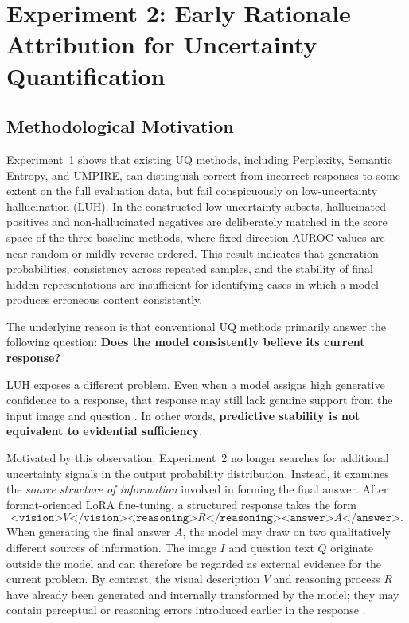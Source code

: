 \section{Experiment 2: Early Rationale Attribution for Uncertainty Quantification}
\label{sec:era_method}

\subsection{Methodological Motivation}
\label{subsec:era_motivation}

Experiment~1 shows that existing UQ methods, including Perplexity, Semantic Entropy, and UMPIRE, can distinguish correct from incorrect responses to some extent on the full evaluation data, but fail conspicuously on low-uncertainty hallucination (LUH). In the constructed low-uncertainty subsets, hallucinated positives and non-hallucinated negatives are deliberately matched in the score space of the three baseline methods, where fixed-direction AUROC values are near random or mildly reverse ordered. This result indicates that generation probabilities, consistency across repeated samples, and the stability of final hidden representations are insufficient for identifying cases in which a model produces erroneous content consistently.

The underlying reason is that conventional UQ methods primarily answer the following question: \textbf{Does the model consistently believe its current response?}

LUH exposes a different problem. Even when a model assigns high generative confidence to a response, that response may still lack genuine support from the input image and question \citep{shi2024trusting}. In other words, \textbf{predictive stability is not equivalent to evidential sufficiency}.

Motivated by this observation, Experiment~2 no longer searches for additional uncertainty signals in the output probability distribution. Instead, it examines the \emph{source structure of information} involved in forming the final answer. After format-oriented LoRA fine-tuning, a structured response takes the form
\[
\texttt{<vision>}V\texttt{</vision>}
\texttt{<reasoning>}R\texttt{</reasoning>}
\texttt{<answer>}A\texttt{</answer>}.
\]
When generating the final answer $A$, the model may draw on two qualitatively different sources of information. The image $I$ and question text $Q$ originate outside the model and can therefore be regarded as external evidence for the current problem. By contrast, the visual description $V$ and reasoning process $R$ have already been generated and internally transformed by the model; they may contain perceptual or reasoning errors introduced earlier in the response \citep{zhang2024snowball}.


